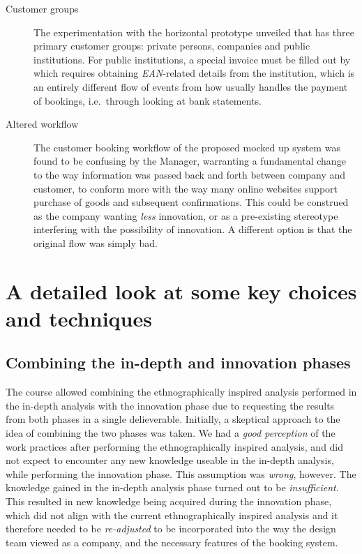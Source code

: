\begin{description}
    \item [Customer groups] The experimentation with the horizontal prototype unveiled that 
        \gomonkey{} has three primary customer groups: private persons, companies and public
        institutions. For public institutions, a special invoice must be filled
        out by \gomonkey{} which requires obtaining \textit{EAN}-related details
        from the institution, which is an entirely different flow of events from
        how \gomonkey{} usually handles the payment of bookings, i.e.\ through
        looking at bank statements. 
    \item [Altered workflow] The customer booking workflow of the proposed mocked up 
        system was found to be confusing by the Manager, warranting a fundamental change 
        to the way information was passed back and forth between company and customer, 
        to conform more with the way many online websites support purchase of goods and 
        subsequent confirmations. This could be construed as the company wanting
        \textit{less} innovation, or as a pre-existing stereotype interfering
        with the possibility of innovation. A different option is that the
        original flow was simply bad.
\end{description}

\section{A detailed look at some key choices and techniques} \label{sec:detailed}
\subsection{Combining the in-depth and innovation phases}


The course allowed combining the ethnographically inspired analysis performed in the
in-depth analysis with the innovation phase due to requesting the results from 
both phases in a single delieverable. Initially, a skeptical approach to the
idea of combining the two phases was taken. We had a \textit{good perception} of the 
work practices after performing the ethnographically inspired analysis, and did not expect
to encounter any new knowledge useable in the in-depth analysis, while performing the 
innovation phase. This assumption was \textit{wrong}, however.
The knowledge gained in the in-depth analysis phase turned out
to be \textit{insufficient}. This resulted in new knowledge being
acquired during the innovation phase, which did not align with the current 
ethnographically inspired analysis and it therefore needed to be \textit{re-adjusted} to be incorporated 
into the way the design team viewed 
\gomonkey{} as a company, and the necessary features of the booking system.

